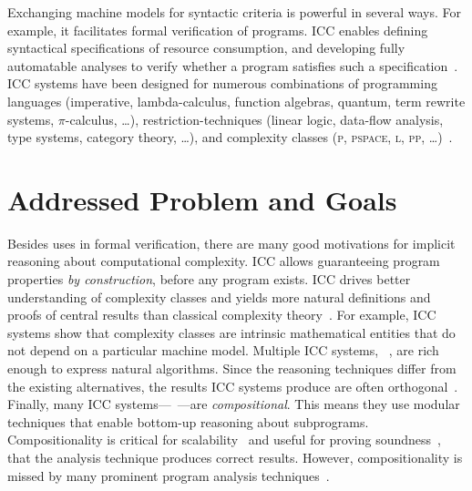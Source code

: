 Exchanging machine models for syntactic criteria is powerful in several ways.
For example, it facilitates formal verification of
programs. ICC enables defining {syntactical}
specifications of resource consumption, and developing
fully automatable analyses to verify whether a program satisfies such a
specification~\cite{heraud2011}. ICC systems have been designed for numerous
combinations of programming languages (imperative,
lambda-calculus, function algebras, quantum, term rewrite systems, \(\pi\)-calculus, \ldots),
restriction-techniques (linear logic, data-flow
analysis, type systems, category
theory, \ldots), and complexity classes (\textsc{p},
\textsc{pspace}, \textsc{l}, \textsc{pp}, \ldots)~\cite{moyen2017,pchoux2020}.

\section{Addressed Problem and Goals}
\label{sec:aicc-goals}

Besides uses in formal verification, there are many
good motivations for implicit reasoning about computational complexity. ICC
allows guaranteeing program properties \emph{by construction}, before any
program exists. ICC drives better understanding of complexity
classes and yields more natural definitions and proofs
of central results than classical complexity
theory~\cite{kristiansen2017}. For example, ICC systems
show that complexity classes are intrinsic mathematical entities that do not
depend on a particular machine model. Multiple ICC systems,
\eg~\cite{jones2009,marion2011}, are rich enough to express natural algorithms.
Since the reasoning techniques differ from the existing alternatives, the
results ICC systems produce are often orthogonal~\cite{aubert20222}. Finally,
many ICC systems---\eg~\cite{jones2009,marion2011,hainry2023,atkey2024}---are
\emph{compositional}. This means they use modular
techniques that enable bottom-up reasoning about subprograms. Compositionality
is critical for scalability~\cite{carbonneaux2015} and useful for proving
soundness~\cite{keidel2021}, \ie that the analysis technique
produces correct results. However, compositionality is missed by many prominent
program analysis techniques~\cite{carbonneaux2015,schiebel2024}.

